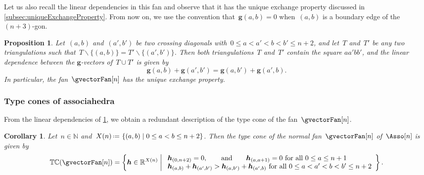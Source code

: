 \documentclass{amsart}
\newtheorem{corollary}[theorem]{Corollary}
\newtheorem{proposition}[theorem]{Proposition}
\theoremstyle{definition}
\newcommand{\R}{\mathbb{R}} %
\newcommand{\N}{\mathbb{N}} %
\renewcommand{\b}[1]{{\boldsymbol{#1}}} %
\newcommand{\set}[2]{\left\{ #1 \;\middle|\; #2 \right\}} %
\newcommand{\ssm}{\smallsetminus} %
\newcommand{\eqdef}{\mbox{\,\raisebox{0.2ex}{\scriptsize\ensuremath{\mathrm:}}\ensuremath{=}\,}} %
\newcommand{\gvector}[1]{\b{g}(#1)} %
\newcommand{\typeCone}{\mathbb{TC}} %
\begin{document}
Let us also recall the linear dependencies in this fan and observe that it has the unique exchange property discussed in \cref{subsec:uniqueExchangeProperty}.
From now on, we use the convention that~$\gvector{a,b} = 0$ when~$(a,b)$ is a boundary edge of the $(n+3)$-gon.

\begin{proposition}
\label{prop:exchangeablePairsAsso}
Let~$(a,b)$ and~$(a',b')$ be two crossing diagonals with~${0 \le a < a' < b < b' \le n+2}$, and let~$T$ and~$T'$ be any two triangulations such that~$T \ssm \{(a,b)\} = T' \ssm \{(a',b')\}$.
Then both triangulations~$T$ and~$T'$ contain the square $aa'bb'$, and the linear dependence between the $\b{g}$-vectors of~$T \cup T'$ is given by
\[
\gvector{a,b} + \gvector{a',b'} = \gvector{a,b'} + \gvector{a',b}.
\]
In particular, the fan~$\gvectorFan[n]$ has the unique exchange property.
\end{proposition}


\subsubsection{Type cones of associahedra}

From the linear dependencies of \cref{prop:exchangeablePairsAsso}, we obtain a redundant description of the type cone of the fan~$\gvectorFan[n]$.

\begin{corollary}
\label{coro:typeConeAsso}
Let~$n \in \N$ and~$X(n) \eqdef \set{(a,b)}{0 \le a < b \le n+2}$. Then the type cone of the normal fan~$\gvectorFan[n]$ of~$\Asso[n]$ is given by
\[
\typeCone(\gvectorFan[n]) = \set{\b{h} \in \R^{X(n)}}{\begin{array}{l} \b{h}_{(0,n+2)} = 0, \qquad\text{and}\qquad \b{h}_{(a,a+1)} = 0 \text{ for all } 0 \le a \le n+1 \\ \b{h}_{(a,b)} + \b{h}_{(a',b')} > \b{h}_{(a,b')} + \b{h}_{(a',b)} \text{ for all } 0 \le a < a' < b < b' \le n+2 \end{array}}.
\]
\end{corollary}
\end{document}
